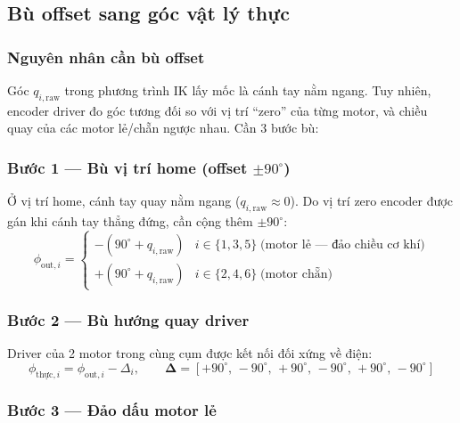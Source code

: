 \documentclass[12pt,a4paper]{article}
\begin{document}
\subsection{Bù offset sang góc vật lý thực}

\subsubsection{Nguyên nhân cần bù offset}

Góc $q_{i,\text{raw}}$ trong phương trình IK lấy mốc là cánh tay nằm ngang.
Tuy nhiên, encoder driver đo góc tương đối so với vị trí ``zero'' của
từng motor, và chiều quay của các motor lẻ/chẵn ngược nhau. Cần 3 bước bù:

\subsubsection{Bước 1 --- Bù vị trí home (offset $\pm90^{\circ}$)}

Ở vị trí home, cánh tay quay nằm ngang ($q_{i,\text{raw}} \approx 0$). Do vị trí
zero encoder được gán khi cánh tay thẳng đứng, cần cộng thêm $\pm 90^{\circ}$:
\begin{equation}
  \phi_{\text{out},i} = \begin{cases}
    -(90^{\circ} + q_{i,\text{raw}}) & i \in \{1{,}3{,}5\}\;\text{(motor lẻ --- đảo chiều cơ khí)}\\
    +(90^{\circ} + q_{i,\text{raw}}) & i \in \{2{,}4{,}6\}\;\text{(motor chẵn)}
  \end{cases}
  \label{eq:step1}
\end{equation}

\subsubsection{Bước 2 --- Bù hướng quay driver}

Driver của 2 motor trong cùng cụm được kết nối đối xứng về điện:
\begin{equation}
  \phi_{\text{thực},i} = \phi_{\text{out},i} - \Delta_i,
  \qquad \boldsymbol{\Delta} = [+90^{\circ}{,}\,-90^{\circ}{,}\,+90^{\circ}{,}\,-90^{\circ}{,}\,+90^{\circ}{,}\,-90^{\circ}]
  \label{eq:step2}
\end{equation}

\subsubsection{Bước 3 --- Đảo dấu motor lẻ}
\end{document}

